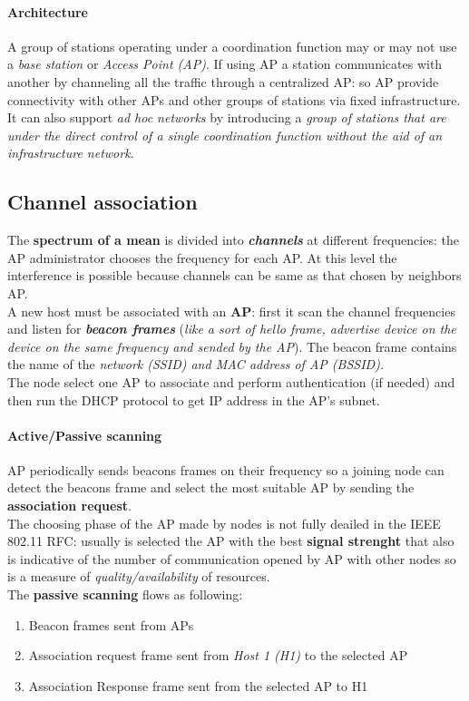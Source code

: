 \documentclass[10pt,a4paper]{report}
\theoremstyle{definition}
\begin{document}
\paragraph{Architecture}\label{sec:architecture}
A group of stations operating under a coordination function may or may not use a \textit{base station} or \textit{Access Point (AP)}.
If using AP a station communicates with another by channeling all the traffic through a centralized AP: so AP provide connectivity with other APs and other groups of stations via fixed infrastructure.
It can also support \textit{ad hoc networks} by introducing a \textit{group of stations that are under the direct control of a single coordination function without the aid of an infrastructure network}.
\subsection{Channel association}\label{sec:channel-association}
The \textbf{spectrum of a mean} is divided into \textit{\textbf{channels}} at different frequencies: the AP administrator chooses the frequency for each AP. At this level the interference is possible because channels can be same as that chosen by neighbors AP.\\
A new host must be associated with an \textbf{AP}: first it scan the channel frequencies and listen for \textit{\textbf{beacon frames}} (\textit{like a sort of hello frame, advertise device on the device on the same frequency and sended by the AP}). The beacon frame contains the name of the \textit{network (SSID) and MAC address of AP (BSSID).}\\
The node select one AP to associate and perform authentication (if needed) and then run the DHCP protocol to get IP address in the AP's subnet.

\paragraph{Active/Passive scanning}\label{sec:activepassive-scanning}
AP periodically sends beacons frames on their frequency so a joining node can detect the beacons frame and select the most suitable AP by sending the \textbf{association request}.\\
The choosing phase of the AP made by nodes is not fully deailed in the IEEE 802.11 RFC: usually is selected the AP with the best \textbf{signal strenght} that also is indicative of the number of communication opened by AP with other nodes so is a measure of \textit{quality/availability} of resources.\\
The \textbf{passive scanning} flows as following:
\begin{enumerate}
	\item 
	Beacon frames sent from APs
	\item 
	Association request frame sent from \textit{Host 1 (H1)} to the selected AP
	\item 
	Association Response frame sent from the selected AP to H1
\end{enumerate}
\end{document}
